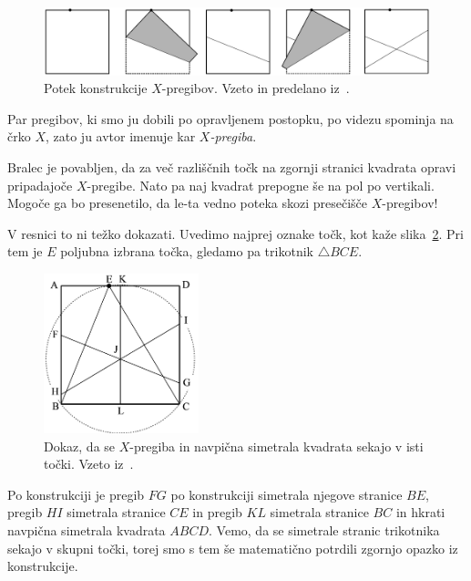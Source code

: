\begin{figure}[h]
    \centering
    \includegraphics[width=\textwidth]{images/x-pregibi/konstrukcija.png}
    \caption[Konstrukcija $X$-pregibov]{Potek konstrukcije $X$-pregibov. Vzeto in predelano iz~\cite[str.\ 34]{haga2008}.}
    \label{fig:x-pregib_konstr}
\end{figure}

Par pregibov, ki smo ju dobili po opravljenem postopku, po videzu spominja na črko $X$, zato ju avtor imenuje kar \emph{$X$-pregiba}.

Bralec je povabljen, da za več razliščnih točk na zgornji stranici kvadrata opravi pripadajoče $X$-pregibe. Nato pa naj kvadrat prepogne še na pol po vertikali. Mogoče ga bo presenetilo, da le-ta vedno poteka skozi presečišče $X$-pregibov!

V resnici to ni težko dokazati. Uvedimo najprej oznake točk, kot kaže slika~\ref{fig:x-pregib_dokaz}. Pri tem je $E$ poljubna izbrana točka, gledamo pa trikotnik $\triangle BCE$.
\begin{figure}[h]
    \centering
    \includegraphics[width=0.4\textwidth]{images/x-pregibi/dokaz_presecisca.png}
    \caption[Dokaz presečišča $X$-pregibov]{Dokaz, da se $X$-pregiba in navpična simetrala kvadrata sekajo v isti točki. Vzeto iz~\cite[str.\ 38]{haga2008}.}
    \label{fig:x-pregib_dokaz}
\end{figure}
Po konstrukciji je pregib $FG$ po konstrukciji simetrala njegove stranice $BE$, pregib $HI$ simetrala stranice $CE$ in pregib $KL$ simetrala stranice $BC$ in hkrati navpična simetrala kvadrata $ABCD$. Vemo, da se simetrale stranic trikotnika sekajo v skupni točki, torej smo s tem še matematično potrdili zgornjo opazko iz konstrukcije.

